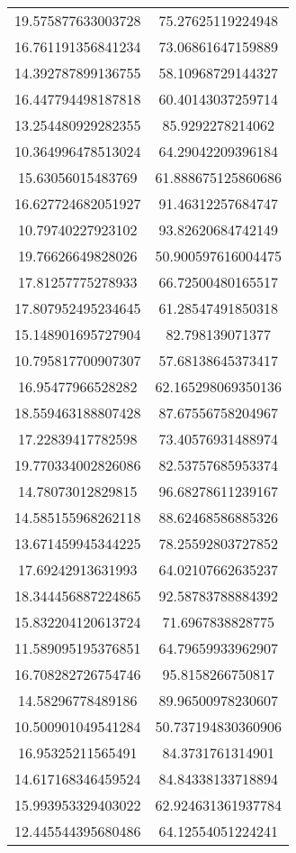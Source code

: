 \begin{table}
\begin{tabular}{cc}
19.575877633003728 & 75.27625119224948 \\
16.761191356841234 & 73.06861647159889 \\
14.392787899136755 & 58.10968729144327 \\
16.447794498187818 & 60.40143037259714 \\
13.254480929282355 & 85.9292278214062 \\
10.364996478513024 & 64.29042209396184 \\
15.63056015483769 & 61.888675125860686 \\
16.627724682051927 & 91.46312257684747 \\
10.79740227923102 & 93.82620684742149 \\
19.76626649828026 & 50.900597616004475 \\
17.81257775278933 & 66.72500480165517 \\
17.807952495234645 & 61.28547491850318 \\
15.148901695727904 & 82.798139071377 \\
10.795817700907307 & 57.68138645373417 \\
16.95477966528282 & 62.165298069350136 \\
18.559463188807428 & 87.67556758204967 \\
17.22839417782598 & 73.40576931488974 \\
19.770334002826086 & 82.53757685953374 \\
14.78073012829815 & 96.68278611239167 \\
14.585155968262118 & 88.62468586885326 \\
13.671459945344225 & 78.25592803727852 \\
17.69242913631993 & 64.02107662635237 \\
18.344456887224865 & 92.58783788884392 \\
15.832204120613724 & 71.6967838828775 \\
11.589095195376851 & 64.79659933962907 \\
16.708282726754746 & 95.8158266750817 \\
14.58296778489186 & 89.96500978230607 \\
10.500901049541284 & 50.737194830360906 \\
16.95325211565491 & 84.3731761314901 \\
14.617168346459524 & 84.84338133718894 \\
15.993953329403022 & 62.924631361937784 \\
12.445544395680486 & 64.12554051224241 \\

\end{tabular}
\end{table}
